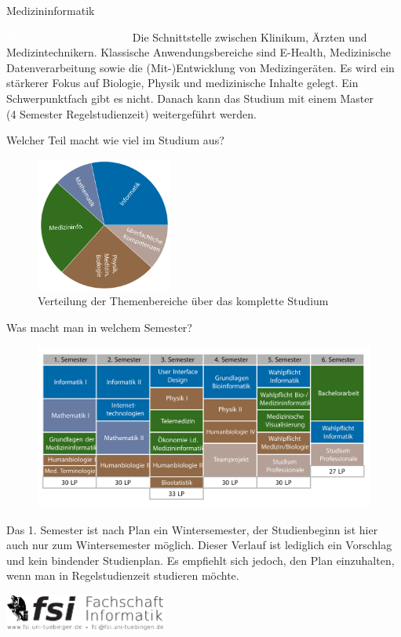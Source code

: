 	\begin{Huge}
			Medizininformatik
		\end{Huge}
		\begin{exampleblock}{\textcolor{white}{Was ist der Studiengang?}}
			Die Schnittstelle zwischen Klinikum, Ärzten und Medizintechnikern. Klassische Anwendungsbereiche sind E-Health, Medizinische Datenverarbeitung sowie die (Mit-)Entwicklung von Medizingeräten. Es wird ein stärkerer Fokus auf Biologie, Physik und medizinische Inhalte gelegt. Ein Schwerpunktfach gibt es nicht. Danach kann das Studium mit einem Master \\ (4 Semester Regelstudienzeit) weitergeführt werden.
		\end{exampleblock}
	
	\begin{block}{Welcher Teil macht wie viel im Studium aus?}
		\begin{figure}[h!]
			\includegraphics[width=0.4\textwidth]{charts/medizininformatik-Piechart.pdf}
			\caption{Verteilung der Themenbereiche über das komplette Studium}
		\end{figure}
	\end{block}
	
	\begin{block}{Was macht man in welchem Semester?}
		\begin{figure}[h!]
			\includegraphics[width=\textwidth]{charts/medizininformatik_Studienplan_abWS18.pdf}
		\end{figure}
		Das 1. Semester ist nach Plan ein Wintersemester, der Studienbeginn ist hier auch nur zum Wintersemester möglich. 
		Dieser Verlauf ist lediglich ein Vorschlag und kein bindender Studienplan. Es empfiehlt sich jedoch, den Plan einzuhalten, wenn man in Regelstudienzeit studieren möchte.
	\end{block}
\vfill
\begin{flushright}
	\includegraphics[width=0.4\textwidth]{fsilogo.pdf}
\end{flushright}